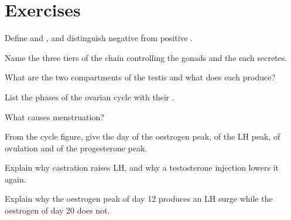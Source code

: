 \section{Exercises}

\begin{exercise}[$\star$]\label{exo:g11:hormones-and-reproduction:1}
Define  and , and distinguish negative from positive
.
\end{exercise}

\begin{exercise}[$\star$]\label{exo:g11:hormones-and-reproduction:2}
Name the three tiers of the chain controlling the gonads and the
 each secretes.
\end{exercise}

\begin{exercise}[$\star$]\label{exo:g11:hormones-and-reproduction:3}
What are the two compartments of the testis and what does each
produce?
\end{exercise}

\begin{exercise}[$\star$]\label{exo:g11:hormones-and-reproduction:4}
List the phases of the ovarian cycle with their .
\end{exercise}

\begin{exercise}[$\star$]\label{exo:g11:hormones-and-reproduction:5}
What causes menstruation?
\end{exercise}

\begin{exercise}[$\star\star$]\label{exo:g11:hormones-and-reproduction:6}
From the cycle figure, give the day of the oestrogen peak, of the LH
peak, of ovulation and of the progesterone peak.
\end{exercise}

\begin{exercise}[$\star\star$]\label{exo:g11:hormones-and-reproduction:7}
Explain why castration raises LH, and why a testosterone injection
lowers it again.
\end{exercise}

\begin{exercise}[$\star\star$]\label{exo:g11:hormones-and-reproduction:8}
Explain why the oestrogen peak of day 12 produces an LH surge while
the oestrogen of day 20 does not.
\end{exercise}

